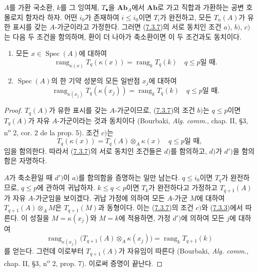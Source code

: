 \begin{proposition}[7.3.11]
\label{III.7.3.11-fr}
$A$를 가환 국소환, $k$를 그 잉여체, $T_\bullet$을
$\mathbf{Ab}_A$에서 $\mathbf{Ab}$로 가고 직합과 가환하는 공변
호몰로지 함자라 하자. 어떤 $i_0$가 존재하여 $i\leq i_0$이면
$T_i$가 완전하고, 모든 $T_n(A)$가 유한 표시를 갖는 $A$-가군이라고
가정한다. 그러면 (\hyperref[III.7.3.7-fr]{7.3.7})의 서로 동치인
조건 $a)$, $b)$, $c)$는 다음 두 조건을 함의하며, 환이 더 나아가
축소환이면 이 두 조건과도 동치이다.
\begin{enumerate}
  \item[d)] 모든 $x\in\operatorname{Spec}(A)$에 대하여
    \[
      \operatorname{rang}_{\kappa(x)}T_q(\kappa(x))
      =
      \operatorname{rang}_kT_q(k)
      \quad q\leq p\text{일 때}.
    \]
  \item[$d'$)] $\operatorname{Spec}(A)$의 한 기약 성분의 모든 일반점
    $x_j$에 대하여
    \[
      \operatorname{rang}_{\kappa(x_j)}T_q(\kappa(x_j))
      =
      \operatorname{rang}_kT_q(k)
      \quad q\leq p\text{일 때}.
    \]
\end{enumerate}
\end{proposition}

\begin{proof}
$T_q(A)$가 유한 표시를 갖는 $A$-가군이므로,
(\hyperref[III.7.3.7-fr]{7.3.7})의 조건 $b)$는 $q\leq p$이면
$T_q(A)$가 자유 $A$-가군이라는 것과 동치이다 (Bourbaki,
\emph{Alg. comm.}, chap. II, \S 3, n\textsuperscript{o} 2, cor. 2
de la prop. 5). 조건 $c)$는
\[
  T_q(\kappa(x))=T_q(A)\otimes_A\kappa(x)
  \quad q\leq p\text{일 때},
\]
임을 함의한다. 따라서 (\hyperref[III.7.3.7-fr]{7.3.7})의 서로 동치인
조건들은 $d)$를 함의하고, $d)$가 $d')$을 함의함은 자명하다.

$A$가 축소환일 때 $d')$이 $a)$를 함의함을 증명하는 일만 남는다.
$q\leq i_0$이면 $T_q$가 완전하므로, $q\leq p$에 관하여 귀납하자.
$k\leq q<p$이면 $T_k$가 완전하다고 가정하고 $T_{q+1}(A)$가 자유
$A$-가군임을 보이겠다. 귀납 가정에 의하여 모든 $A$-가군 $M$에
대하여 $T_{q+1}(A)\otimes_A M$은 $T_{q+1}(M)$과 동형이다. 이는
(\hyperref[III.7.3.7-fr]{7.3.7})의 조건 $c)$와
(\hyperref[III.7.3.3-fr]{7.3.3})에서 따른다. 이 성질을
$M=\kappa(x_j)$와 $M=k$에 적용하면, 가정 $d')$에 의하여 모든 $j$에
대하여
\[
  \operatorname{rang}_{\kappa(x_j)}
  \bigl(T_{q+1}(A)\otimes_A\kappa(x_j)\bigr)
  =
  \operatorname{rang}_kT_{q+1}(k)
\]
를 얻는다. 그런데 이로부터 $T_{q+1}(A)$가 자유임이 따른다
(Bourbaki, \emph{Alg. comm.}, chap. II, \S 3,
n\textsuperscript{o} 2, prop. 7). 이로써 증명이 끝난다.
\end{proof}

